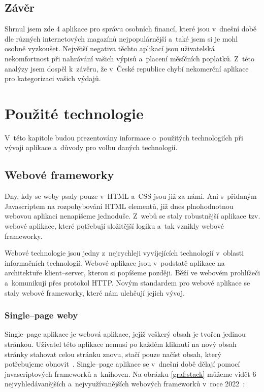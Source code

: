 \section{Závěr}
Shrnul jsem zde 4 aplikace pro správu osobních financí, které jsou v~dnešní době dle různých internetových magazínů nejpopulárnější a~také jsem si je mohl osobně vyzkoušet. Největší negativa těchto aplikací jsou uživatelská nekomfortnost při nahrávání vašich výpisů a~placení měsíčních poplatků. Z~této analýzy jsem dospěl k~závěru, že v~České republice chybí nekomerční aplikace pro kategorizaci vašich výdajů.

\chapter{Použité technologie}
V~této kapitole budou prezentovány informace o~použitých technologiích při vývoji aplikace a~důvody pro volbu daných technologií.
\section{Webové frameworky}

Dny, kdy se weby psaly pouze v~HTML a~CSS jsou již za námi. Ani s~přidaným Javascriptem na rozpohybování HTML elementů, již dnes plnohodnotnou webovou aplikaci nenapíšeme jednoduše. Z~webů se staly robustnější aplikace tzv. webové aplikace, které potřebují složitější logiku a~tak vznikly webové frameworky.

Webové technologie jsou jedny z~nejrychleji vyvíjejících technologií v~oblasti informačních technologií. Webové aplikace jsou v~podstatě aplikace na architektuře klient--server, kterou si popíšeme později. Běží ve webovém prohlížeči a~komunikují přes protokol HTTP. Novým standardem pro webové aplikace se staly webové frameworky, které nám ulehčují jejich vývoj.

\subsection{Single--page weby}
Single--page aplikace je webová aplikace, jejíž veškerý obsah je tvořen jedinou stránkou. Uživatel této aplikace nemusí po každém kliknutí na nový obsah stránky stahovat celou stránku znovu, stačí pouze načíst obsah, který potřebujeme obnovit~\cite{barborakoouskov_2020_co}.
Single--page aplikace se v~dnešní době dělají pomocí javascriptových frameworků a~knihoven. Na obrázku \ref{graf:stack} můžeme vidět 6 nejvyhledávanějších a~nejvyužívanějších webových frameworků v~roce 2022~\cite{stackoverflow}:

